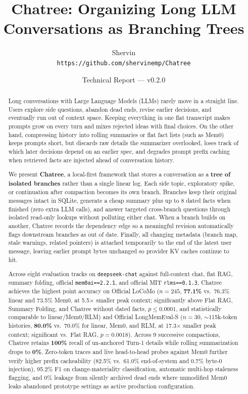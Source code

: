 \documentclass[10pt,twocolumn]{article}
\title{\textbf{Chatree: Organizing Long LLM Conversations as Branching Trees}}
\author{
  Shervin \\
  \texttt{https://github.com/shervinemp/Chatree}
}
\date{Technical Report --- v0.2.0}
\begin{document}
\maketitle

\begin{abstract}
Long conversations with Large Language Models (LLMs) rarely move in a straight line. Users explore side questions, abandon dead ends, revise earlier decisions, and eventually run out of context space. Keeping everything in one flat transcript makes prompts grow on every turn and mixes rejected ideas with final choices. On the other hand, compressing history into rolling summaries or flat fact lists (such as Mem0) keeps prompts short, but discards raw details the summarizer overlooked, loses track of which later decisions depend on an earlier spec, and degrades prompt prefix caching when retrieved facts are injected ahead of conversation history.

We present \textbf{Chatree}, a local-first framework that stores a conversation as a \textbf{tree of isolated branches} rather than a single linear log. Each side topic, exploratory spike, or continuation after compaction becomes its own branch. Branches keep their original messages intact in SQLite, generate a cheap summary plus up to 8 dated facts when finished (zero extra LLM calls), and answer targeted cross-branch questions through isolated read-only lookups without polluting either chat. When a branch builds on another, Chatree records the dependency edge so a meaningful revision automatically flags downstream branches as out of date. Finally, all changing metadata (branch map, stale warnings, related pointers) is attached temporarily to the end of the latest user message, leaving earlier prompt bytes unchanged so provider KV caches continue to hit.

Across eight evaluation tracks on \texttt{deepseek-chat} against full-context chat, flat RAG, summary folding, official \texttt{mem0ai==2.2.1}, and official MIT \texttt{rlms==0.1.3}, Chatree achieves the highest point accuracy on Official LoCoMo ($n=245$, \textbf{77.1\%} vs.\ 76.3\% linear and 73.5\% Mem0, at 5.5$\times$ smaller peak context; significantly above Flat RAG, Summary Folding, and Chatree without dated facts, $p \le 0.0001$, and statistically comparable to linear/Mem0/RLM) and Official LongMemEval-S ($n=30$, $\sim$115k-token histories, \textbf{80.0\%} vs.\ 70.0\% for linear, Mem0, and RLM, at 17.3$\times$ smaller peak context; significant vs.\ Flat RAG, $p=0.0018$). Across 9 successive compactions, Chatree retains \textbf{100\%} recall of un-anchored Turn-1 details while rolling summarization drops to \textbf{0\%}. Zero-token traces and live head-to-head probes against Mem0 further verify higher prefix cacheability (82.5\% vs.\ 61.0\% end-of-system and 0.7\% byte-0 injection), 95.2\% F1 on change-materiality classification, automatic multi-hop staleness flagging, and 0\% leakage from silently archived dead ends where unmodified Mem0 leaks abandoned prototype settings as active production configuration.
\end{abstract}
\end{document}
